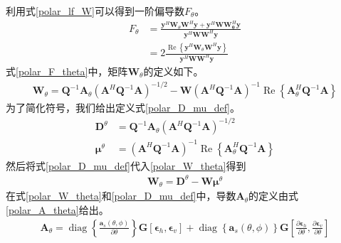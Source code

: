 \documentclass[master]{thesis-uestc}
\begin{document}
利用式\eqref{polar_lf_W}可以得到一阶偏导数$F_\theta$。
\begin{equation}\label{polar_F_theta}
    \begin{aligned}
        F_\theta &= 
        \frac{\bm{y}^H\bm{W}_\theta\bm{W}^H\bm{y} + \bm{y}^H\bm{W}\bm{W}^H_\bm{\theta}\bm{y}}
        {\bm{y}^H\bm{W}\bm{W}^H\bm{y}} \\
        &= 2\frac{\operatorname{Re}\left\{\bm{y}^H\bm{W}_\theta\bm{W}^H\bm{y}\right\}}
        {\bm{y}^H\bm{W}\bm{W}^H\bm{y}}
    \end{aligned}
\end{equation}
式\eqref{polar_F_theta}中，矩阵$\bm{W}_\theta$的定义如下。
\begin{equation}\label{polar_W_theta}
    \begin{aligned}
        \bm{W}_\theta = 
        \bm{Q}^{-1}\bm{A}_\theta\left(\bm{A}^H\bm{Q}^{-1}\bm{A}\right)^{-1/2} - 
        \bm{W}\left(\bm{A}^H\bm{Q}^{-1}\bm{A}\right)^{-1}
        \operatorname{Re}\left\{\bm{A}^H_\theta\bm{Q}^{-1}\bm{A}\right\}
    \end{aligned}
\end{equation}
为了简化符号，我们给出定义式\eqref{polar_D_mu_def}。
\begin{subequations}\label{polar_D_mu_def}
    \begin{align}
        \bm{D}^{\theta} &= \bm{Q}^{-1}\bm{A}_\theta\left(\bm{A}^H\bm{Q}^{-1}\bm{A}\right)^{-1/2} \\
        \bm{\mu}^\theta &= \left(\bm{A}^H\bm{Q}^{-1}\bm{A}\right)^{-1}
        \operatorname{Re}\left\{\bm{A}^H_\theta\bm{Q}^{-1}\bm{A}\right\}
    \end{align}
\end{subequations}
然后将式\eqref{polar_D_mu_def}代入\eqref{polar_W_theta}得到
\begin{equation}
    \begin{aligned}
        \bm{W}_\theta = \bm{D}^\theta - \bm{W}\bm{\mu}^\theta
    \end{aligned}
\end{equation}
在式\eqref{polar_W_theta}和\eqref{polar_D_mu_def}中，导数$\bm{A}_\theta$的定义由式\eqref{polar_A_theta}给出。
\begin{equation}\label{polar_A_theta}
    \begin{aligned}
        \bm{A}_\theta = 
        \operatorname{diag}\left\{\frac{\bm{a}_s(\theta,\phi)}{\partial\theta}\right\}
        \bm{G}\left[\bm{\epsilon}_h,\bm{\epsilon}_v\right] + 
        \operatorname{diag}\left\{\bm{a}_s(\theta,\phi)\right\}\bm{G}
        \left[\frac{\partial\bm{\epsilon}_h}{\partial\theta},\frac{\partial\bm{\epsilon}_v}{\partial\theta}\right]
    \end{aligned}
\end{equation}
\end{document}
